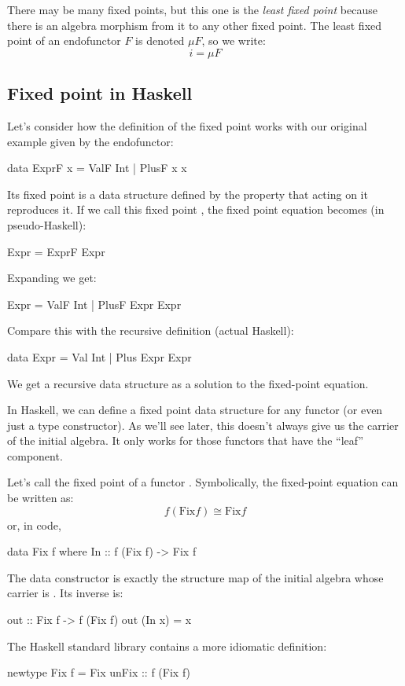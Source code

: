 \documentclass[DaoFP]{subfiles}
\begin{document}
There may be many fixed points, but this one is the \emph{least fixed point} because there is an algebra morphism from it to any other fixed point. The least fixed point of an endofunctor $F$ is denoted $\mu F$, so we write:
\[ i = \mu F \]
\subsection{Fixed point in Haskell}
Let's consider how the definition of the fixed point works with our original example given by the endofunctor:
\begin{haskell}
data ExprF x = ValF Int | PlusF x x
\end{haskell}
Its fixed point is a data structure defined by the property that  acting on it reproduces it. If we call this fixed point , the fixed point equation becomes  (in pseudo-Haskell):
\begin{haskell}
Expr = ExprF Expr
\end{haskell}
Expanding  we get:
\begin{haskell}
Expr = ValF Int | PlusF Expr Expr
\end{haskell}
Compare this with the recursive definition (actual Haskell):
\begin{haskell}
data Expr = Val Int | Plus Expr Expr
\end{haskell}
We get a recursive data structure as a solution to the fixed-point equation.

In Haskell, we can define a fixed point data structure for any functor (or even just a type constructor). As we'll see later, this doesn't always give us the carrier of the initial algebra. It only works for those functors that have the ``leaf'' component.

Let's call  the fixed point of a functor . Symbolically, the fixed-point equation can be written as:
\[f ( \text{Fix} f) \cong  \text{Fix} f \]
or, in code,
\begin{haskell}
data Fix f where
  In :: f (Fix f) -> Fix f
\end{haskell}
The data constructor  is exactly the structure map of the initial algebra whose carrier is . Its inverse is:
\begin{haskell}
out :: Fix f -> f (Fix f)
out (In x) = x
\end{haskell}
The Haskell standard library contains a more idiomatic definition:
\begin{haskell}
newtype Fix f = Fix { unFix :: f (Fix f) }
\end{haskell}
\end{document}
